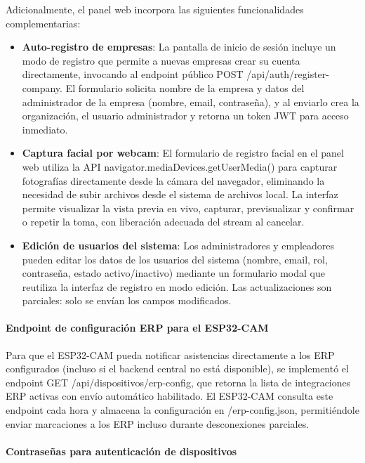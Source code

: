 Adicionalmente, el panel web incorpora las siguientes funcionalidades complementarias:

\begin{itemize}
    \item \textbf{Auto-registro de empresas}: La pantalla de inicio de sesión incluye un modo de registro que permite a nuevas empresas crear su cuenta directamente, invocando al endpoint público POST /api/auth/register-company. El formulario solicita nombre de la empresa y datos del administrador de la empresa (nombre, email, contraseña), y al enviarlo crea la organización, el usuario administrador y retorna un token JWT para acceso inmediato.
    \item \textbf{Captura facial por webcam}: El formulario de registro facial en el panel web utiliza la API navigator.mediaDevices.getUserMedia() para capturar fotografías directamente desde la cámara del navegador, eliminando la necesidad de subir archivos desde el sistema de archivos local. La interfaz permite visualizar la vista previa en vivo, capturar, previsualizar y confirmar o repetir la toma, con liberación adecuada del stream al cancelar.
    \item \textbf{Edición de usuarios del sistema}: Los administradores y empleadores pueden editar los datos de los usuarios del sistema (nombre, email, rol, contraseña, estado activo/inactivo) mediante un formulario modal que reutiliza la interfaz de registro en modo edición. Las actualizaciones son parciales: solo se envían los campos modificados.
\end{itemize}

\paragraph{Endpoint de configuración ERP para el ESP32-CAM}

Para que el ESP32-CAM pueda notificar asistencias directamente a los ERP configurados (incluso si el backend central no está disponible), se implementó el endpoint GET /api/dispositivos/erp-config, que retorna la lista de integraciones ERP activas con envío automático habilitado. El ESP32-CAM consulta este endpoint cada hora y almacena la configuración en /erp-config.json, permitiéndole enviar marcaciones a los ERP incluso durante desconexiones parciales.

\paragraph{Contraseñas para autenticación de dispositivos}

